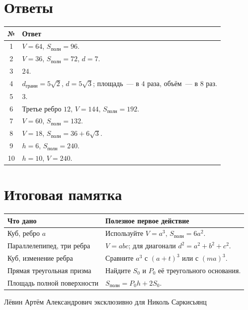\documentclass[a4paper,11pt]{article}
\begin{document}
\clearpage
\section*{Ответы}
\vspace{5mm}
\begin{center}
\renewcommand{\arraystretch}{1.48}
\begin{tabularx}{\linewidth}{@{}cX@{}}
\toprule
№ & Ответ\\
\midrule
1 & $V=64$, $S_{\text{полн}}=96$.\\
2 & $V=36$, $S_{\text{полн}}=72$, $d=7$.\\
3 & $24$.\\
4 & $d_{\text{грани}}=5\sqrt2$, $d=5\sqrt3$; площадь~--- в $4$ раза, объём~--- в $8$ раз.\\
5 & $3$.\\
6 & Третье ребро $12$, $V=144$, $S_{\text{полн}}=192$.\\
7 & $V=60$, $S_{\text{полн}}=132$.\\
8 & $V=18$, $S_{\text{полн}}=36+6\sqrt3$.\\
9 & $h=6$, $S_{\text{полн}}=240$.\\
10 & $h=10$, $V=240$.\\
\bottomrule
\end{tabularx}
\end{center}
\vspace{15mm}
\section*{Итоговая памятка}
\begin{tabularx}{\linewidth}{@{}p{43mm}X@{}}
\toprule
Что дано & Полезное первое действие\\
\midrule
Куб, ребро $a$ & Используйте $V=a^3$, $S_{\text{полн}}=6a^2$.\\
Параллелепипед, три ребра & $V=abc$; для диагонали $d^2=a^2+b^2+c^2$.\\
Куб, изменение ребра & Сравните $a^3$ с $(a+t)^3$ или с $(ma)^3$.\\
Прямая треугольная призма & Найдите $S_0$ и $P_0$ её треугольного основания.\\
Площадь полной поверхности & $S_{\text{полн}}=P_0h+2S_0$.\\
\bottomrule
\end{tabularx}
\vfill
\begin{center}
\small\color{textgray}Лёвин Артём Александрович эксклюзивно для Николь Саркисьянц
\end{center}
\end{document}
